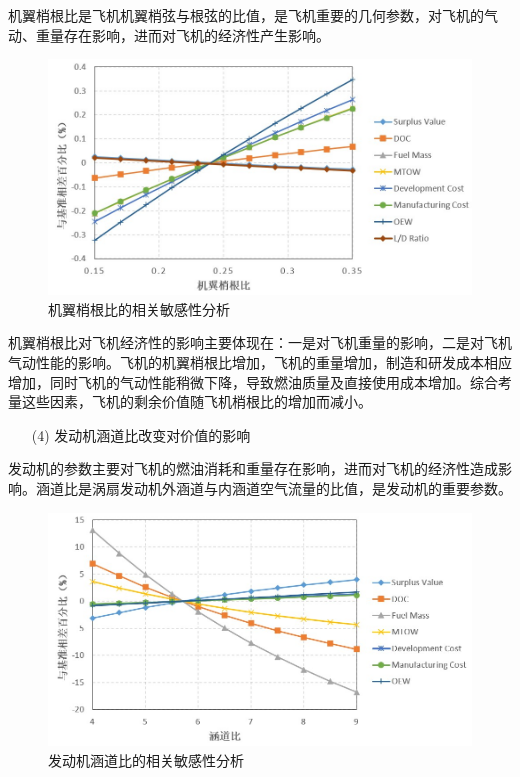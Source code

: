 \documentclass[12pt,a4paper]{report}
\begin{document}
机翼梢根比是飞机机翼梢弦与根弦的比值，是飞机重要的几何参数，对飞机的气动、重量存在影响，进而对飞机的经济性产生影响。
 \begin{figure}[!htp]
  \centering
  \includegraphics[width=.9\textwidth]{eps/SVvsTaperRatio.jpg}
  \caption{机翼梢根比的相关敏感性分析}
 \label{fig:Wingtapersens}
\end{figure}
机翼梢根比对飞机经济性的影响主要体现在：一是对飞机重量的影响，二是对飞机气动性能的影响。飞机的机翼梢根比增加，飞机的重量增加，制造和研发成本相应增加，同时飞机的气动性能稍微下降，导致燃油质量及直接使用成本增加。综合考量这些因素，飞机的剩余价值随飞机梢根比的增加而减小。

 \begin{itemize}
    \item[(4)] 发动机涵道比改变对价值的影响
\end{itemize}

发动机的参数主要对飞机的燃油消耗和重量存在影响，进而对飞机的经济性造成影响。涵道比是涡扇发动机外涵道与内涵道空气流量的比值，是发动机的重要参数。
 \begin{figure}[!htp]
  \centering
  \includegraphics[width=.9\textwidth]{eps/SVvsBPR.jpg}
  \caption{发动机涵道比的相关敏感性分析}
 \label{fig:BPRsens}
\end{figure}
\end{document}
